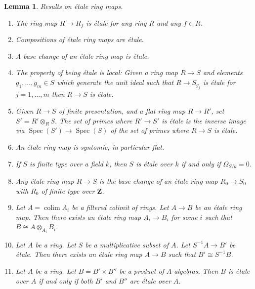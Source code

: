 \documentclass{amsart}
\theoremstyle{plain}
\newtheorem{lemma}[subsection]{Lemma}
\theoremstyle{definition}
\theoremstyle{remark}
\numberwithin{equation}{subsection}
\def\colim{\mathop{\mathrm{colim}}\nolimits}
\def\Spec{\mathop{\mathrm{Spec}}}
\begin{document}
\begin{lemma}
\label{lemma-etale}
Results on \'etale ring maps.
\begin{enumerate}
\item The ring map $R \to R_f$ is \'etale for any ring $R$ and any $f \in R$.
\item Compositions of \'etale ring maps are \'etale.
\item A base change of an \'etale ring map is \'etale.
\item The property of being \'etale is local: Given a ring map
$R \to S$ and elements $g_1, \ldots, g_m \in S$ which generate the unit ideal
such that $R \to S_{g_j}$ is \'etale for $j = 1, \ldots, m$ then
$R \to S$ is \'etale.
\item Given $R \to S$ of finite presentation, and a flat ring map
$R \to R'$, set $S' = R' \otimes_R S$. The set of primes where $R' \to S'$
is \'etale is the inverse image via $\Spec(S') \to \Spec(S)$
of the set of primes where $R \to S$ is \'etale.
\item An \'etale ring map is syntomic, in particular flat.
\item If $S$ is finite type over a field $k$, then $S$ is \'etale over
$k$ if and only if $\Omega_{S/k} = 0$.
\item Any \'etale ring map $R \to S$ is the base change of an \'etale
ring map $R_0 \to S_0$ with $R_0$ of finite type over $\mathbf{Z}$.
\item Let $A = \colim A_i$ be a filtered colimit of rings.
Let $A \to B$ be an \'etale ring map. Then there exists an \'etale ring
map $A_i \to B_i$ for some $i$ such that $B \cong A \otimes_{A_i} B_i$.
\item Let $A$ be a ring. Let $S$ be a multiplicative subset of $A$.
Let $S^{-1}A \to B'$ be \'etale. Then there exists an \'etale ring map
$A \to B$ such that $B' \cong S^{-1}B$.
\item Let $A$ be a ring. Let $B = B' \times B''$ be a product of $A$-algebras.
Then $B$ is \'etale over $A$ if and only if both $B'$ and $B''$ are
\'etale over $A$.
\end{enumerate}
\end{lemma}
\end{document}
